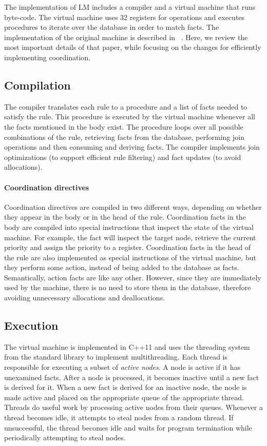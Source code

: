 The implementation of LM includes a compiler and a virtual machine that runs
byte-code. The virtual machine uses 32 registers for
operations and executes procedures to iterate over the database in order to match facts.
The implementation of the original machine is described in ~\cite{cruz-ppdp14}.
Here, we review the most important details of that paper, while focusing on the
changes for efficiently implementing coordination.

\subsection{Compilation}

The compiler translates each rule to a procedure and a list of facts needed
to satisfy the rule. This procedure is executed by the virtual
machine whenever all the facts mentioned in the body exist.
The procedure loops over all possible combinations of the rule, retrieving facts from the
database, performing join operations and then consuming and deriving facts.
The compiler implements join optimizations (to support efficient rule filtering)
and fact updates (to avoid allocations).

\paragraph{Coordination directives}
Coordination directives are compiled in two different ways, depending on whether they
appear in the body or in the head of the rule. Coordination facts in the body
are compiled into special instructions that inspect the state of the virtual
machine. For example, the fact  will inspect the
target node, retrieve the current priority and assign the priority to a
register. Coordination facts in the head of the rule are also implemented as
special instructions of the virtual machine, but they perform some action,
instead of being added to the database as facts.
Semantically, action facts are like any other. However, since they are
immediately used by the machine, there is no need to store them in the
database, therefore avoiding unnecessary allocations and deallocations.

\subsection{Execution}

The virtual machine is implemented in C++11 and uses the threading system from
the standard library to implement multithreading. Each thread is responsible for
executing a subset of \emph{active nodes}. A node is active if it has unexamined
facts. After a node is processed, it becomes inactive until a new fact is
derived for it. When a new fact is derived for an
inactive node, the node is made active and placed on the appropriate queue of
the appropriate thread.  Threads do useful work by processing active nodes from their queues. Whenever a
thread becomes idle, it attempts to steal nodes from a random thread.
If unsuccessful, the thread becomes idle and waits for program
termination while periodically attempting to steal nodes.

